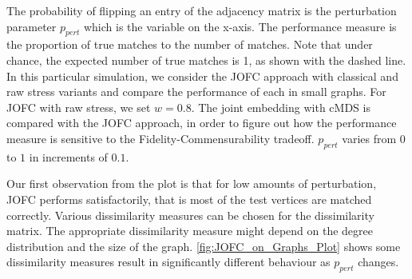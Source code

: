 \documentclass[12pt,oneside,final]{thesis}
\begin{document}
  The probability of flipping an entry of the adjacency matrix is the perturbation parameter $p_{pert}$ which is the variable on the x-axis. 
  The performance measure is the proportion of true matches to the number of matches. Note that 
  under chance, the expected number of true matches is 1, as shown with the dashed line. In this particular simulation, we consider the JOFC approach with classical and raw stress variants and compare the performance of each in small graphs. For JOFC with raw stress, we set $w=0.8$. The joint embedding with cMDS is compared with  the JOFC approach, in order to figure out how the performance measure is sensitive to the Fidelity-Commensurability tradeoff. 
  $p_{pert}$ varies from $0$ to $1$ in increments of $0.1$.  
  



  

 




\begin{knitrout}
\color{fgcolor}\begin{kframe}


{\ttfamily\noindent\bfseries{}}\end{kframe}
\end{knitrout}



\begin{knitrout}
\color{fgcolor}\begin{kframe}


{\ttfamily\noindent\color{warningcolor}{\#\# Warning: there is no package called 'arrayhelpers'\\\#\# Warning: there is no package called 'ggplot2'}}

{\ttfamily\noindent\bfseries{}}

{\ttfamily\noindent\bfseries{}}

{\ttfamily\noindent\bfseries{}}\end{kframe}
\end{knitrout}


Our first observation from the plot is that for low amounts of perturbation, JOFC performs satisfactorily, that is most of the test vertices are matched correctly. Various dissimilarity measures can be chosen for the dissimilarity matrix. The appropriate dissimilarity measure might depend on the degree distribution and the size of the graph. \autoref{fig:JOFC_on_Graphs_Plot} shows some dissimilarity measures result in significantly different behaviour as $p_{pert}$  changes.
\end{document}
